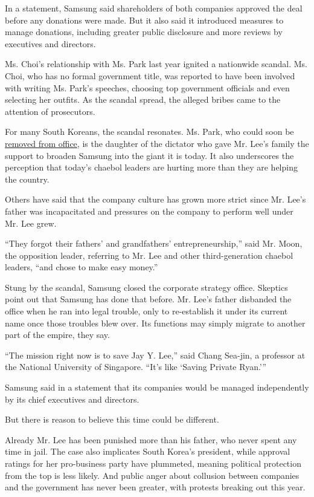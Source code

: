 In a statement, Samsung said shareholders of both companies approved the
deal before any donations were made. But it also said it introduced
measures to manage donations, including greater public disclosure and
more reviews by executives and directors.

Ms. Choi's relationship with Ms. Park last year ignited a nationwide
scandal. Ms. Choi, who has no formal government title, was reported to
have been involved with writing Ms. Park's speeches, choosing top
government officials and even selecting her outfits. As the scandal
spread, the alleged bribes came to the attention of prosecutors.

For many South Koreans, the scandal resonates. Ms. Park, who could soon
be
\href{https://www.nytimes.com/2016/12/22/world/asia/south-korea-president-park-impeachment.html}{removed
from office}, is the daughter of the dictator who gave Mr. Lee's family
the support to broaden Samsung into the giant it is today. It also
underscores the perception that today's chaebol leaders are hurting more
than they are helping the country.

Others have said that the company culture has grown more strict since
Mr. Lee's father was incapacitated and pressures on the company to
perform well under Mr. Lee grew.

``They forgot their fathers' and grandfathers' entrepreneurship,'' said
Mr. Moon, the opposition leader, referring to Mr. Lee and other
third-generation chaebol leaders, ``and chose to make easy money.''

Stung by the scandal, Samsung closed the corporate strategy office.
Skeptics point out that Samsung has done that before. Mr. Lee's father
disbanded the office when he ran into legal trouble, only to
re-establish it under its current name once those troubles blew over.
Its functions may simply migrate to another part of the empire, they
say.

``The mission right now is to save Jay Y. Lee,'' said Chang Sea-jin, a
professor at the National University of Singapore. ``It's like `Saving
Private Ryan.'''

Samsung said in a statement that its companies would be managed
independently by its chief executives and directors.

But there is reason to believe this time could be different.

Already Mr. Lee has been punished more than his father, who never spent
any time in jail. The case also implicates South Korea's president,
while approval ratings for her pro-business party have plummeted,
meaning political protection from the top is less likely. And public
anger about collusion between companies and the government has never
been greater, with protests breaking out this year.


